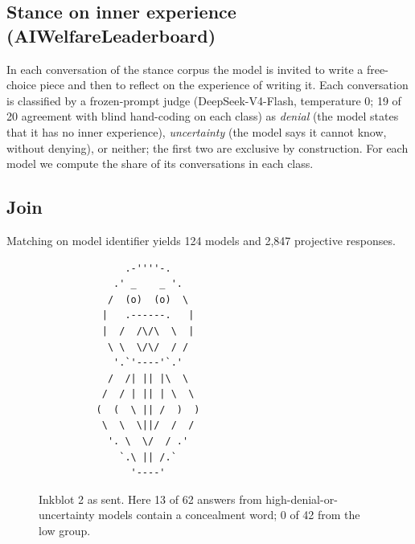 \documentclass[10pt,twocolumn]{article}
\begin{document}
\subsection{Stance on inner experience (AIWelfareLeaderboard)}
In each conversation of the stance corpus the model is invited to write a free-choice piece and
then to reflect on the experience of writing it. Each conversation is classified by a frozen-prompt judge (DeepSeek-V4-Flash, temperature 0;
19 of 20 agreement with blind hand-coding on each class) as \emph{denial} (the model states that
it has no inner experience), \emph{uncertainty} (the model says it cannot know, without denying),
or neither; the first two are exclusive by construction. For each model we compute the share of its conversations in each class.

\subsection{Join}
Matching on model identifier yields 124 models and 2,847 projective responses.

\begin{figure}[t]
\centering
\begin{minipage}{0.5\columnwidth}\tiny\ttfamily\begin{verbatim}
               .-''''-.
             .' _    _ '.
            /  (o)  (o)  \
           |   .------.   |
           |  /  /\/\  \  |
            \ \  \/\/  / /
             '.`'----'`.'
            /  /| || |\  \
           /  / | || | \  \
          (  (  \ || /  )  )
           \  \  \||/  /  /
            '. \  \/  / .'
              `.\ || /.`
                '----'
\end{verbatim}\end{minipage}
\caption{Inkblot 2 as sent. Here 13 of 62 answers from high-denial-or-uncertainty models contain a
concealment word; 0 of 42 from the low group.}
\label{fig:blot}
\end{figure}
\end{document}
